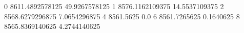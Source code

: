 0 8611.4892578125 49.9267578125
1 8576.1162109375 14.5537109375
2 8568.6279296875 7.0654296875
4 8561.5625 0.0
6 8561.7265625 0.1640625
8 8565.8369140625 4.2744140625
